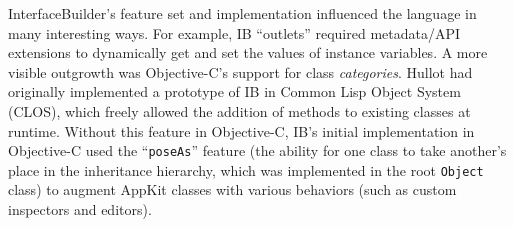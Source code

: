 \documentclass[acmsmall,screen]{acmart}
\begin{document}
InterfaceBuilder's feature set and implementation influenced the language in many interesting ways. For example, IB ``outlets'' required metadata/API extensions to dynamically get and set the values of instance variables. A more visible outgrowth was Objective-C's support for class \emph{categories}. Hullot had originally implemented a prototype of IB in Common Lisp Object System (CLOS), which freely allowed the addition of methods to existing classes at runtime. Without this feature in Objective-C, IB's initial implementation in Objective-C used the ``\verb$poseAs$'' feature (the ability for one class to take another's place in the inheritance hierarchy, which was implemented in the root \verb$Object$ class) to augment AppKit classes with various behaviors (such as custom inspectors and editors).

\addtocounter{appendix_spec.runtime_pagenum}{8}
\addtocounter{appendix_spec.language_pagenum}{5}
\addtocounter{appendix_spec.runtime_pagenum_range_start}{3}
\addtocounter{appendix_spec.runtime_pagenum_range_end}{8}
\end{document}
